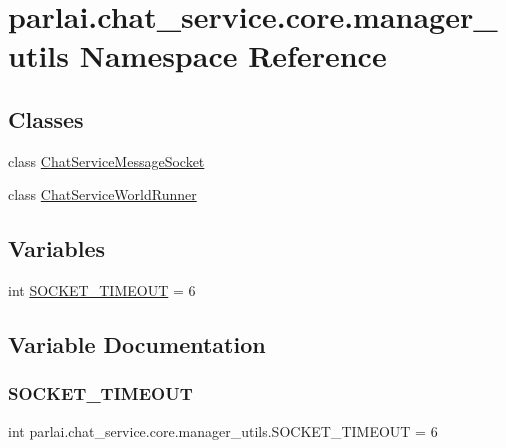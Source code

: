 \hypertarget{namespaceparlai_1_1chat__service_1_1core_1_1manager__utils}{}\section{parlai.\+chat\+\_\+service.\+core.\+manager\+\_\+utils Namespace Reference}
\label{namespaceparlai_1_1chat__service_1_1core_1_1manager__utils}
\subsection*{Classes}
\begin{DoxyCompactItemize}
\item 
class \hyperlink{classparlai_1_1chat__service_1_1core_1_1manager__utils_1_1ChatServiceMessageSocket}{Chat\+Service\+Message\+Socket}
\item 
class \hyperlink{classparlai_1_1chat__service_1_1core_1_1manager__utils_1_1ChatServiceWorldRunner}{Chat\+Service\+World\+Runner}
\end{DoxyCompactItemize}
\subsection*{Variables}
\begin{DoxyCompactItemize}
\item 
int \hyperlink{namespaceparlai_1_1chat__service_1_1core_1_1manager__utils_aea64a209f580a51cf4a9514506ae5317}{S\+O\+C\+K\+E\+T\+\_\+\+T\+I\+M\+E\+O\+UT} = 6
\end{DoxyCompactItemize}


\subsection{Variable Documentation}
\mbox{\label{namespaceparlai_1_1chat__service_1_1core_1_1manager__utils_aea64a209f580a51cf4a9514506ae5317}} 
\subsubsection{\texorpdfstring{S\+O\+C\+K\+E\+T\+\_\+\+T\+I\+M\+E\+O\+UT}{SOCKET\_TIMEOUT}}
{\footnotesize\ttfamily int parlai.\+chat\+\_\+service.\+core.\+manager\+\_\+utils.\+S\+O\+C\+K\+E\+T\+\_\+\+T\+I\+M\+E\+O\+UT = 6}

